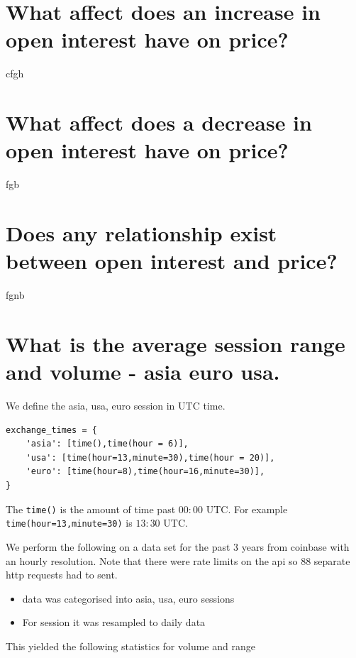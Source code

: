 \section{ What affect does an increase in open interest have on price?}
cfgh
\section{ What affect does a decrease in open interest have on price?}
fgb
\section{ Does any relationship exist between open interest and price?}
fgnb



\section{ What is the average session range and volume - asia euro usa.}


We define the asia, usa, euro session in UTC time.

\begin{verbatim}
exchange_times = {
    'asia': [time(),time(hour = 6)],
    'usa': [time(hour=13,minute=30),time(hour = 20)],
    'euro': [time(hour=8),time(hour=16,minute=30)],   
}
\end{verbatim}
The \texttt{time()} is the amount of time past $00:00$ UTC. For example \texttt{time(hour=13,minute=30)} is $13:30$ UTC.

We perform the following on a data set for the past 3 years from coinbase with an hourly resolution. Note that there were rate limits on the api so 88 separate http requests had to sent.

\begin{itemize}
\item data was categorised into asia, usa, euro sessions
\item For session it was resampled to daily data
\end{itemize}

This yielded the following statistics  for volume and range

